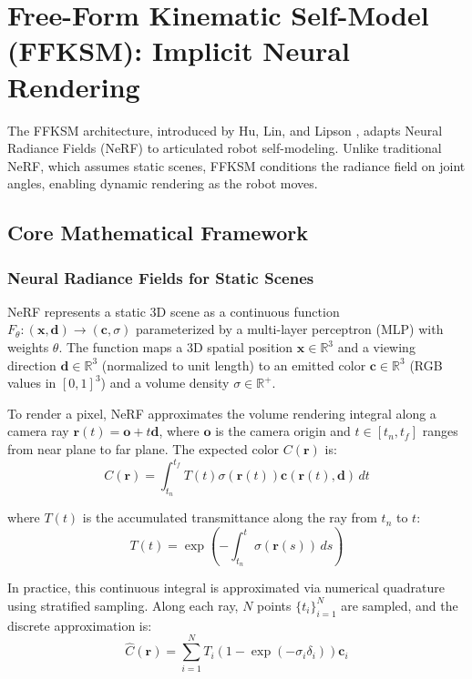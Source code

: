 \documentclass[12pt,a4paper,oneside]{report}
\begin{document}
\section{Free-Form Kinematic Self-Model (FFKSM): Implicit Neural Rendering}

The FFKSM architecture, introduced by Hu, Lin, and Lipson \cite{hu2024teaching}, adapts Neural Radiance Fields (NeRF) \cite{mildenhall2020nerf} to articulated robot self-modeling. Unlike traditional NeRF, which assumes static scenes, FFKSM conditions the radiance field on joint angles, enabling dynamic rendering as the robot moves.
\subsection{Core Mathematical Framework}
\label{subsec:core_mathematical_framework}
\subsubsection{Neural Radiance Fields for Static Scenes}
\label{subsubsec:neural_radiance_fields_for_static_scenes}

NeRF represents a static 3D scene as a continuous function $F_\theta: (\mathbf{x}, \mathbf{d}) \rightarrow (\mathbf{c}, \sigma)$ parameterized by a multi-layer perceptron (MLP) with weights $\theta$. The function maps a 3D spatial position $\mathbf{x} \in \mathbb{R}^3$ and a viewing direction $\mathbf{d} \in \mathbb{R}^3$ (normalized to unit length) to an emitted color $\mathbf{c} \in \mathbb{R}^3$ (RGB values in $[0,1]^3$) and a volume density $\sigma \in \mathbb{R}^+$.

To render a pixel, NeRF approximates the volume rendering integral along a camera ray $\mathbf{r}(t) = \mathbf{o} + t\mathbf{d}$, where $\mathbf{o}$ is the camera origin and $t \in [t_n, t_f]$ ranges from near plane to far plane. The expected color $C(\mathbf{r})$ is:
\begin{equation}C(\mathbf{r}) = \int_{t_n}^{t_f} T(t) \sigma(\mathbf{r}(t)) \mathbf{c}(\mathbf{r}(t), \mathbf{d}) \, dt
\end{equation}

where $T(t)$ is the accumulated transmittance along the ray from $t_n$ to $t$:
\begin{equation}T(t) = \exp\left(-\int_{t_n}^{t} \sigma(\mathbf{r}(s)) \, ds\right)
\end{equation}

In practice, this continuous integral is approximated via numerical quadrature using stratified sampling. Along each ray, $N$ points $\{t_i\}_{i=1}^N$ are sampled, and the discrete approximation is:
\begin{equation}\hat{C}(\mathbf{r}) = \sum_{i=1}^{N} T_i (1 - \exp(-\sigma_i \delta_i)) \mathbf{c}_i
\end{equation}
\end{document}

